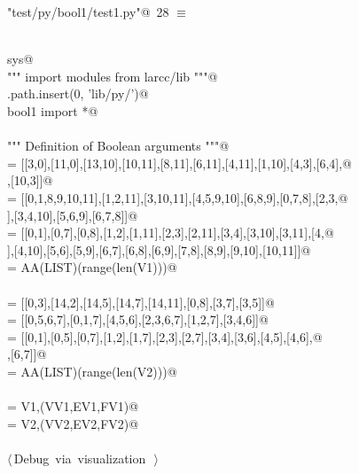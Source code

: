 \documentclass[11pt,oneside]{article}	%
\begin{document}
\begin{flushleft} \small \label{scrap35}
\protect{}\verb@"test/py/bool1/test1.py"@\nobreak\ {\footnotesize 28 }$\equiv$
\vspace{-1ex}
\begin{list}{}{} \item
\mbox{}\verb@@\\
\mbox{}\verb@import sys@\\
\mbox{}\verb@""" import modules from larcc/lib """@\\
\mbox{}\verb@sys.path.insert(0, 'lib/py/')@\\
\mbox{}\verb@from bool1 import *@\\
\mbox{}\verb@@\\
\mbox{}\verb@""" Definition of Boolean arguments """@\\
\mbox{} = [[3,0],[11,0],[13,10],[10,11],[8,11],[6,11],[4,11],[1,10],[4,3],[6,4],@\\
\mbox{}\verb@      [8,4],[10,3]]@\\
\mbox{} = [[0,1,8,9,10,11],[1,2,11],[3,10,11],[4,5,9,10],[6,8,9],[0,7,8],[2,3,@\\
\mbox{}],[3,4,10],[5,6,9],[6,7,8]]@\\
\mbox{} = [[0,1],[0,7],[0,8],[1,2],[1,11],[2,3],[2,11],[3,4],[3,10],[3,11],[4,@\\
\mbox{}],[4,10],[5,6],[5,9],[6,7],[6,8],[6,9],[7,8],[8,9],[9,10],[10,11]]@\\
\mbox{} = AA(LIST)(range(len(V1)))@\\
\mbox{}\verb@@\\
\mbox{} = [[0,3],[14,2],[14,5],[14,7],[14,11],[0,8],[3,7],[3,5]]@\\
\mbox{} = [[0,5,6,7],[0,1,7],[4,5,6],[2,3,6,7],[1,2,7],[3,4,6]]@\\
\mbox{} = [[0,1],[0,5],[0,7],[1,2],[1,7],[2,3],[2,7],[3,4],[3,6],[4,5],[4,6],@\\
\mbox{}\verb@      [5,6],[6,7]]@\\
\mbox{} = AA(LIST)(range(len(V2)))@\\
\mbox{}\verb@@\\
\mbox{} = V1,(VV1,EV1,FV1)@\\
\mbox{} = V2,(VV2,EV2,FV2)@\\
\mbox{}\verb@@\\
\mbox{}\verb@@\hbox{$\langle\,$Debug via visualization\nobreak\ {\footnotesize {}}$\,\rangle$}\verb@@\\
\mbox{}\verb@@{\NWsep}
\end{list}
\vspace{-2ex}
\end{flushleft}
\end{document}
